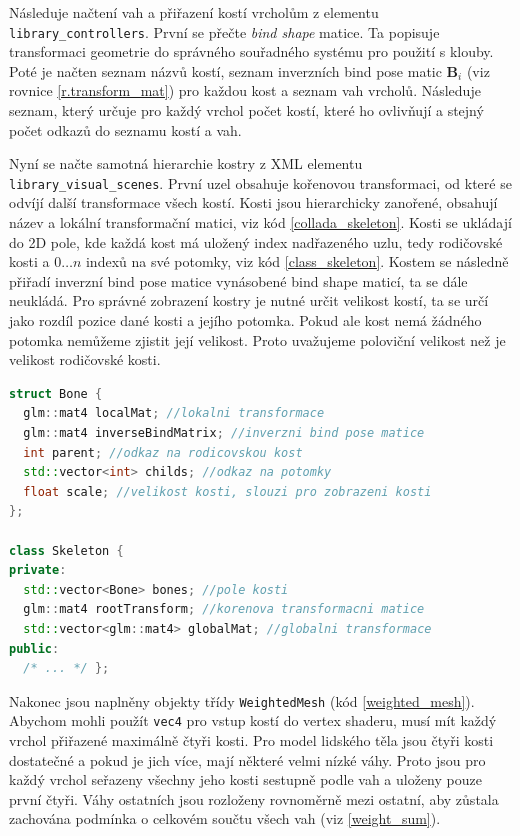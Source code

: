 Následuje načtení vah a přiřazení kostí vrcholům z elementu  \texttt{library\_controllers}. První se přečte \textit{bind shape} matice. Ta popisuje transformaci geometrie do správného souřadného systému pro použití s klouby. Poté je načten seznam názvů kostí, seznam inverzních bind pose matic $\mathbf{B}_i$ (viz rovnice \ref{r.transform_mat}) pro každou kost a seznam vah vrcholů. Následuje seznam, který určuje pro každý vrchol počet kostí, které ho ovlivňují a stejný počet odkazů do seznamu kostí a vah.

Nyní se načte samotná hierarchie kostry z XML elementu \texttt{library\_visual\_scenes}. První uzel obsahuje kořenovou transformaci, od které se odvíjí další transformace všech kostí. Kosti jsou hierarchicky zanořené, obsahují název a lokální transformační matici, viz kód \ref{collada_skeleton}. Kosti se ukládají do 2D pole, kde každá kost má uložený index nadřazeného uzlu, tedy rodičovské kosti a $0 \dots n$ indexů na své potomky, viz kód \ref{class_skeleton}. Kostem se následně přiřadí inverzní bind pose matice vynásobené bind shape maticí, ta se dále neukládá. Pro správné zobrazení kostry je nutné určit velikost kostí, ta se určí jako rozdíl pozice dané kosti a jejího potomka. Pokud ale kost nemá žádného potomka nemůžeme zjistit její velikost. Proto uvažujeme poloviční velikost než je velikost rodičovské kosti.

\begin{lstlisting}[float,floatplacement=H,language=C++, caption={Třída kostry.}, label={class_skeleton}
]
struct Bone {
  glm::mat4 localMat; //lokalni transformace
  glm::mat4 inverseBindMatrix; //inverzni bind pose matice
  int parent; //odkaz na rodicovskou kost
  std::vector<int> childs; //odkaz na potomky
  float scale; //velikost kosti, slouzi pro zobrazeni kosti 
};

class Skeleton {
private:
  std::vector<Bone> bones; //pole kosti
  glm::mat4 rootTransform; //korenova transformacni matice
  std::vector<glm::mat4> globalMat; //globalni transformace
public:
  /* ... */ };
\end{lstlisting}

Nakonec jsou naplněny objekty třídy \texttt{WeightedMesh} (kód \ref{weighted_mesh}). Abychom mohli použít \texttt{vec4} pro vstup kostí do vertex shaderu, musí mít každý vrchol přiřazené maximálně čtyři kosti. Pro model lidského těla jsou čtyři kosti dostatečné a pokud je jich více, mají některé velmi nízké váhy. Proto jsou pro každý vrchol seřazeny všechny jeho kosti sestupně podle vah a uloženy pouze první čtyři. Váhy ostatních jsou rozloženy rovnoměrně mezi ostatní, aby zůstala zachována podmínka o celkovém součtu všech vah (viz \ref{weight_sum}).

